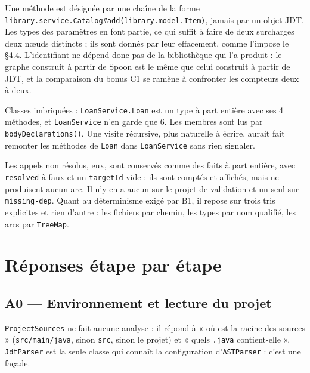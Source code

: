\documentclass[11pt,a4paper]{article}
\begin{document}
Une méthode est désignée par une chaîne de la forme \texttt{library.service.Catalog\#add(library.model.Item)}, jamais par un objet JDT. Les types des paramètres en font partie, ce qui suffit à faire de deux surcharges deux n\oe{}uds distincts ; ils sont donnés par leur effacement, comme l'impose le §4.4. L'identifiant ne dépend donc pas de la bibliothèque qui l'a produit : le graphe construit à partir de Spoon est le même que celui construit à partir de JDT, et la comparaison du bonus C1 se ramène à confronter les compteurs deux à deux.

Classes imbriquées : \texttt{LoanService.Loan} est un type à part entière avec ses 4 méthodes, et \texttt{LoanService} n'en garde que 6. Les membres sont lus par \texttt{bodyDeclarations()}. Une visite récursive, plus naturelle à écrire, aurait fait remonter les méthodes de \texttt{Loan} dans \texttt{LoanService} sans rien signaler.

Les appels non résolus, eux, sont conservés comme des faits à part entière, avec \texttt{resolved} à faux et un \texttt{targetId} vide : ils sont comptés et affichés, mais ne produisent aucun arc. Il n'y en a aucun sur le projet de validation et un seul sur \texttt{missing-dep}. Quant au déterminisme exigé par B1, il repose sur trois tris explicites et rien d'autre : les fichiers par chemin, les types par nom qualifié, les arcs par \texttt{TreeMap}.

\section{Réponses étape par étape}

\subsection{A0 --- Environnement et lecture du projet}

\texttt{ProjectSources} ne fait aucune analyse : il répond à « où est la racine des sources » (\texttt{src/main/java}, sinon \texttt{src}, sinon le projet) et « quels \texttt{.java} contient-elle ». \texttt{JdtParser} est la seule classe qui connaît la configuration d'\texttt{ASTParser} : c'est une façade.
\end{document}
